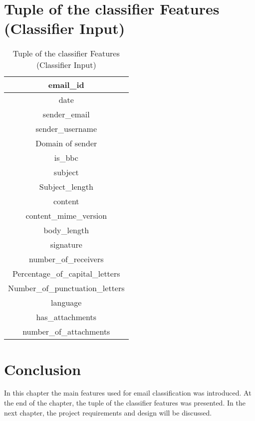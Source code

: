 \newpage
\section {Tuple of the classifier Features (Classifier Input)}
\label{sec:3_classifier_tuple}

\begin{center}
\begin{table}[H]
\begin{center}
\begin{tabular}{|c|}
\hline 
email\_id\tabularnewline
\hline
date\tabularnewline
\hline 
sender\_email\tabularnewline
\hline 
sender\_username\tabularnewline
\hline 
Domain of sender\tabularnewline
\hline 
is\_bbc\tabularnewline
\hline 
subject\tabularnewline
\hline 
Subject\_length\tabularnewline
\hline 
content\tabularnewline
\hline 
content\_mime\_version\tabularnewline
\hline 
body\_length\tabularnewline
\hline 
signature\tabularnewline
\hline 
number\_of\_receivers\tabularnewline
\hline 
Percentage\_of\_capital\_letters\tabularnewline
\hline 
Number\_of\_punctuation\_letters\tabularnewline
\hline 
language\tabularnewline
\hline 
has\_attachments\tabularnewline
\hline 
number\_of\_attachments\tabularnewline
\hline
\end{tabular}
\end{center}
\caption[Tuple of the classifier Features (Classifier Input)]{Tuple of the classifier Features (Classifier Input)}
\end{table}
\end{center}

\newpage


\section{Conclusion}
\label{sec:conclusion_3}
In this chapter the main features used for email classification was introduced.
At the end of the chapter, the tuple of the classifier features was presented. In the next chapter, the project requirements and design  will be  discussed.
